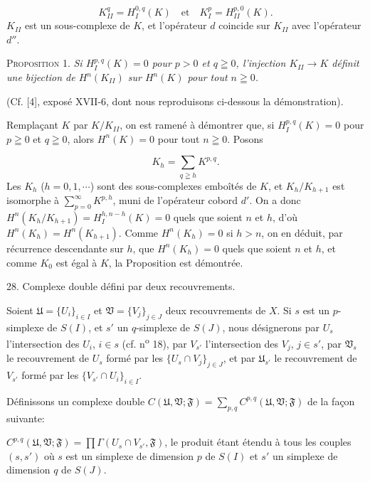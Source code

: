 \begin{equation*}
K_{II}^q = H_I^{0,q}(K) \quad \text{et} \quad K_I^p = H_{II}^{p,0}(K).
\end{equation*}
$K_{II}$ est un sous-complexe de $K$, et l'opérateur $d$ coincide sur $K_{II}$ avec l'opérateur $d''$.



\textsc{Proposition} 1. \textit{Si $H_I^{p,q}(K) = 0$ pour $p > 0$ et $q \geqq 0$, l'injection $K_{II} \to K$ définit une bijection de $H^n(K_{II})$ sur $H^n(K)$ pour tout $n \geqq 0$.}

(Cf. [4], exposé XVII-6, dont nous reproduisons ci-dessous la démonstration).

Remplaçant $K$ par $K/K_{II}$, on est ramené à démontrer que, si $H_I^{p,q}(K) = 0$ pour $p \geqq 0$ et $q \geqq 0$, alors $H^n(K) = 0$ pour tout $n \geqq 0$. Posons

\begin{equation*}
K_h = \sum_{q \geqq h} K^{p,q}.
\end{equation*}
Les $K_h$ ($h = 0, 1, \cdots$) sont des sous-complexes emboîtés de $K$, et $K_h/K_{h+1}$ est isomorphe à $\sum_{p=0}^{\infty} K^{p,h}$, muni de l'opérateur cobord $d'$. On a donc $H^n(K_h/K_{h+1}) = H_I^{h,n-h}(K) = 0$ quels que soient $n$ et $h$, d'où $H^n(K_h) = H^n(K_{h+1})$. Comme $H^n(K_h) = 0$ si $h > n$, on en déduit, par récurrence descendante sur $h$, que $H^n(K_h) = 0$ quels que soient $n$ et $h$, et comme $K_0$ est égal à $K$, la Proposition est démontrée.


28. Complexe double défini par deux recouvrements.

Soient $\mathfrak{U} = \{U_i\}_{i \in I}$ et $\mathfrak{V} = \{V_j\}_{j \in J}$ deux recouvrements de $X$. Si $s$ est un $p$-simplexe de $S(I)$, et $s'$ un $q$-simplexe de $S(J)$, nous désignerons par $U_s$ l'intersection des $U_i$, $i \in s$ (cf. n\textsuperscript{o} 18), par $V_{s'}$ l'intersection des $V_j$, $j \in s'$, par $\mathfrak{V}_s$ le recouvrement de $U_s$ formé par les $\{U_s \cap V_j\}_{j \in J}$, et par $\mathfrak{U}_{s'}$ le recouvrement de $V_{s'}$ formé par les $\{V_{s'} \cap U_i\}_{i \in I}$.

Définissons un complexe double $C(\mathfrak{U}, \mathfrak{V}; \mathfrak{F}) = \sum_{p,q} C^{p,q}(\mathfrak{U}, \mathfrak{V}; \mathfrak{F})$ de la façon suivante:

$C^{p,q}(\mathfrak{U}, \mathfrak{V}; \mathfrak{F}) = \prod \Gamma (U_s \cap V_{s'}, \mathfrak{F})$, le produit étant étendu à tous les couples $(s, s')$ où $s$ est un simplexe de dimension $p$ de $S(I)$ et $s'$ un simplexe de dimension $q$ de $S(J)$.

